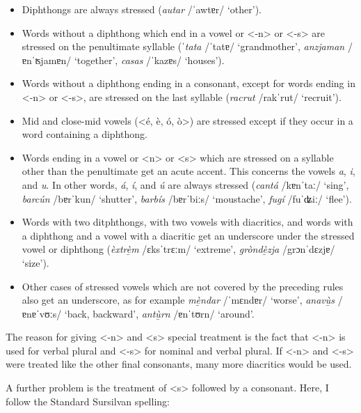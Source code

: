 {\begin{itemize}
	\item Diphthongs are always stressed (\textit{autar} /ˈawtɐr/ `other').
	\item Words without a diphthong which end in a vowel or <-n> or <-s> are stressed on the penultimate syllable (\textit{ˈtata} /ˈtatɐ/ `grandmother', \textit{anzjaman} /ɐnˈʦjamɐn/ `together', \textit{casas} /ˈkazɐs/ `houses').
	\item Words without a diphthong ending in a consonant, except for words ending in <-n> or <-s>, are stressed on the last syllable (\textit{racrut} /rakˈrut/ `recruit').
	\item Mid and close-mid vowels (<é, è, ó, ò>) are stressed except if they occur in a word containing a diphthong.
	\item Words ending in a vowel or <n> or <s> which are stressed on a syllable other than the penultimate get an acute accent. This concerns the vowels \textit{a}, \textit{i}, and \textit{u}. In other words, \textit{á}, \textit{í}, and \textit{ú} are always stressed (\textit{cantá} /kɐnˈtaː/ `sing', \textit{barcún} /bɐrˈkun/ `shutter', \textit{barbís} /bɐrˈbiːs/ `moustache', \textit{fugí} /fuˈʥiː/ `flee').
	\item Words with two ditphthongs, with two vowels with diacritics, and words with a diphthong and a vowel with a diacritic get an underscore under the stressed vowel or diphthong (\textit{èxtrè̱m} /ɛksˈtrɛːm/ `extreme', \textit{gròndè̱zja} /grɔnˈdɛzjɐ/ `size').
	\item Other cases of stressed vowels which are not covered by the preceding rules also get an underscore, as for example \textit{mè̱ndar} /ˈmɛndɐr/ `worse', \textit{anavù̱s} /ɐnɐˈvʊːs/ `back, backward', \textit{antù̱rn} /ɐnˈtʊrn/ `around'.
\end{itemize}


The reason for giving <-n> and <s> special treatment is the fact that <-n> is used for verbal plural and <-s> for nominal and verbal plural. If <-n> and <-s> were treated like the other final consonants, many more diacritics would be used.

A further problem is the treatment of <s> followed by a consonant. Here, I follow the Standard Sursilvan spelling:

\begin{itemize}
	

\end{itemize}}
